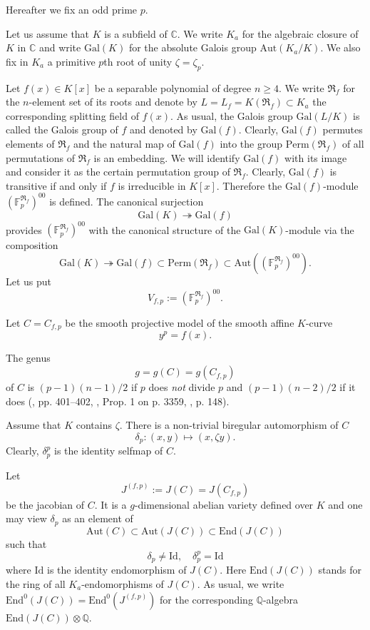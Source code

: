 \documentclass[12pt,a4paper,reqno]{amsart}
\def\Q{{\mathbb Q}}
\def\C{{\mathbb C}}
\def\R{{\mathbb R}}
\def\F{{\mathbb F}}
\def\R{{\mathfrak R}}
\def\Gal{\mathrm{Gal}}
\def\Perm{\mathrm{Perm}}
\def\End{\mathrm{End}}
\def\Aut{\mathrm{Aut}}
\def\Id{\mathrm{Id}}
\theoremstyle{definition}
\begin{document}
 Hereafter we fix an odd  prime $p$.
 

 
 
 
 
 Let us  assume
that $K$ is a subfield of $\C$.
We write $K_a$ for
the algebraic closure of $K$ in $\C$ and write $\Gal(K)$ for the absolute
Galois group $\Aut(K_a/K)$. We also fix in $K_a$ a primitive $p$th
root of unity $\zeta=\zeta_p$.

Let $f(x) \in K[x]$ be a separable polynomial of degree $n \ge 4$.
We write $\R_f$ for the $n$-element set of its roots and denote by
$L=L_f=K(\R_f)\subset K_a$ the corresponding splitting field of $f(x)$. As
usual, the Galois group $\Gal(L/K)$ is called the Galois group of
$f$ and denoted by $\Gal(f)$. Clearly, $\Gal(f)$ permutes elements
of $\R_f$ and the natural map of $\Gal(f)$ into the group
$\Perm(\R_f)$ of all permutations of $\R_f$ is an embedding. We
will identify $\Gal(f)$ with its image and consider it as the certain
permutation group of $\R_f$. Clearly, $\Gal(f)$ is transitive if
and only if $f$ is irreducible in $K[x]$. Therefore the
$\Gal(f)$-module $(\F_p^{\R_f})^{00}$ is defined. The canonical
surjection $$\Gal(K) \twoheadrightarrow \Gal(f)$$ provides
$(\F_p^{\R_f})^{00}$ with the canonical structure of the
$\Gal(K)$-module via the composition $$\Gal(K)\twoheadrightarrow
\Gal(f)\subset \Perm(\R_f) \subset \Aut((\F_p^{\R_f})^{00}).$$
Let us put 
\begin{equation}
\label{Vfp}
V_{f,p}:=(\F_p^{\R_f})^{00}.
\end{equation}

 Let $C=C_{f,p}$ be the smooth projective model of the smooth
affine $K$-curve
            $$y^p=f(x).$$


The genus $$g=g(C)=g(C_{f,p})$$ of $C$   is
$(p-1)(n-1)/2$ if $p$ does {\sl not} divide
$p$ and $(p-1)(n-2)/2$ if it does  (\cite{Koo}, pp. 401--402, \cite{Towse}, Prop. 1 on p. 3359,
 \cite{Poonen}, p. 148).

 Assume that $K$ contains $\zeta$. There is a non-trivial biregular
 automorphism of $C$
 $$\delta_p:(x,y) \mapsto (x, \zeta y).$$
Clearly, $\delta_p^p$ is the identity selfmap of $C$.


Let 
$$J^{(f,p)}:=J(C)=J(C_{f,p})$$
 be the jacobian of $C$. It is a $g$-dimensional abelian variety defined over $K$ and one may view $\delta_p$ as an element of
 $$\Aut(C) \subset\Aut(J(C)) \subset \End(J(C))$$
such that
  $$\delta_p \ne \Id, \quad \delta_p^p=\Id$$
where $\Id$ is the identity endomorphism of $J(C)$.
Here $\End(J(C))$ stands for the ring of all $K_a$-endomorphisms of $J(C)$. As usual, we write $\End^0(J(C))=\End^0(J^{(f,p)})$ for
the corresponding $\Q$-algebra $\End(J(C))\otimes \Q$.
\end{document}
